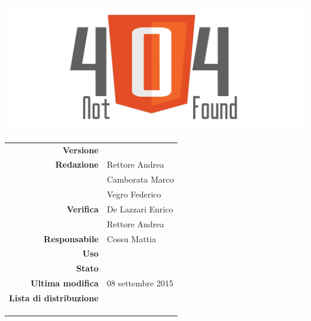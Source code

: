 \thispagestyle{empty}

\begin{titlepage}

	\begin{center}
	\begin{Huge}
		\textbf{\gruppo} \\
	\end{Huge}
	\vspace{0.5cm}
	\begin{Large}
		\textbf{\capitolato}
	\end{Large}
	
	\vspace{1cm}

	\includegraphics[scale=0.35]{../logo/logo404_Extends.png}
	\vspace{1cm}
	\begin{Huge}
		\textbf{\titDoc}
	\end{Huge}
	
	\vspace{1cm}
	
	\begin{table}[h]
	\begin{center}
	\begin{tabular}{r | l}
		\textbf{Versione} & \versione \\
		\textbf{Redazione} & Rettore Andrea \\ 
			& Camborata Marco \\ 
			& Vegro Federico \\
		\textbf{Verifica} & De Lazzari Enrico \\ 
			& Rettore Andrea \\ 
		\textbf{Responsabile} & Cossu Mattia \\
		\textbf{Uso} & \uso \\
		\textbf{Stato} & \stato \\
		\textbf{Ultima modifica} & 08 settembre 2015 \\
		\textbf{Lista di distribuzione} & \gruppo \\ 
			& \Vardanega \\
			& \Cardin \\
			& \Zucchetti \\
	\end{tabular}
	\end{center}
	\end{table}
	\end{center}
\end{titlepage}